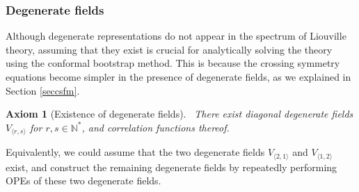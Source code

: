 \documentclass[12pt, a4paper, notitlepage, twoside]{report}
\numberwithin{equation}{section}
\theoremstyle{break}
\newtheorem{hyp}{Axiom}[chapter]
\begin{document}
\subsubsection{Degenerate fields}

Although degenerate representations do not appear in the spectrum of Liouville theory, assuming  that they exist is crucial for analytically solving the theory using the conformal bootstrap method. This is because the crossing symmetry equations become simpler in the presence of degenerate fields, as we explained in Section \ref{seccsfm}.

\begin{hyp}[Existence of degenerate fields]
 ~\label{ax:edf}
There exist diagonal degenerate fields $V_{\langle r,s \rangle}$ for $r,s\in\mathbb{N}^*$, and correlation functions thereof.
\end{hyp}
\noindent
Equivalently, we could assume that the two degenerate fields $V_{\langle 2,1\rangle}$ and $V_{\langle 1,2\rangle}$ exist, and construct the remaining degenerate fields by repeatedly performing OPEs of these two degenerate fields.
\end{document}

